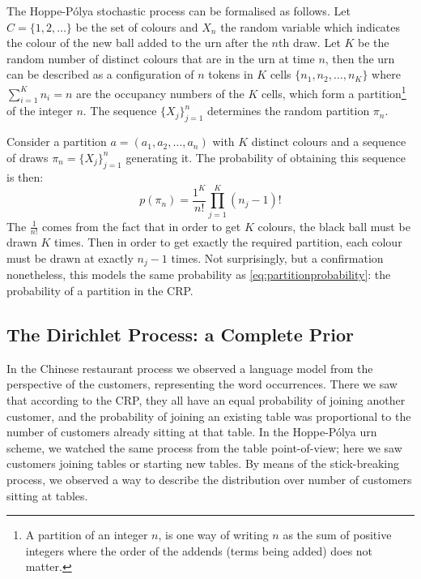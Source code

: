 The Hoppe-P\'olya stochastic process can be formalised as follows. Let $C = \{1,2,\ldots\}$ be the set of colours and $X_n$ the random variable which indicates the colour of the new ball added to the urn after the $n$th draw. Let $K$ be the random number of distinct colours that are in the urn at time $n$, then the urn can be described as a configuration of $n$ tokens in $K$ cells $\{n_1, n_2, \ldots, n_K\}$ where $\sum_{i=1}^K n_i = n$ are the occupancy numbers of the $K$ cells, which form a partition\footnote{A partition of an integer $n$, is one way of writing $n$ as the sum of positive integers where the
order of the addends (terms being added) does not matter.} of the integer $n$. The sequence $\{X_j\}_{j=1}^n$ determines the random partition $\pi_{n}$.

Consider a partition $a = (a_1,a_2,\ldots,a_n)$ with $K$ distinct colours and a sequence of draws $\pi_{n} = \{X_j\}_{j=1}^n$ generating it. The probability of obtaining this sequence is then:
\begin{equation}
	p(\pi_n) = \frac{1^K}{n!}\prod_{j=1}^K (n_j-1)!
\end{equation}
The $\frac{1}{n!}$ comes from the fact that in order to get $K$ colours, the black ball must be drawn $K$ times. Then in order to get exactly the required partition, each colour must be drawn at exactly $n_j-1$ times. Not surprisingly, but a confirmation nonetheless, this models the same probability as \cref{eq:partitionprobability}: the probability of a partition in the CRP.


%


\subsection{The Dirichlet Process: a Complete Prior}
In the Chinese restaurant process we observed a language model from the perspective of the customers, representing the word occurrences. There we saw that according to the CRP, they all have an equal probability of joining another customer, and the probability of joining an existing table was proportional to the number of customers already sitting at that table. In the Hoppe-P\'olya urn scheme, we watched the same process from the table point-of-view; here we saw customers joining tables or starting new tables. By means of the stick-breaking process, we observed a way to describe the distribution over number of customers sitting at tables.

